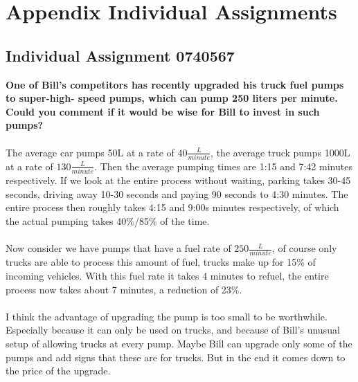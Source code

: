 \section{Appendix Individual Assignments}\label{app:indiv}
\subsection{Individual Assignment 0740567}\label{app:indivnicky}
\textbf{One of Bill’s competitors has recently upgraded his truck fuel pumps to super-high- speed pumps, which can pump 250 liters per minute. Could you comment if it would be wise for Bill to invest in such pumps?}\\
\\
The average car pumps 50L at a rate of $40\frac{L}{minute}$, the average truck pumps 1000L at a rate of $130\frac{L}{minute}$. Then the average pumping times are 1:15 and 7:42 minutes respectively. If we look at the entire process without waiting, parking takes 30-45 seconds, driving away 10-30 seconds and paying 90 seconds to 4:30 minutes. The entire process then roughly takes 4:15 and 9:00s minutes respectively, of which the actual pumping takes 40\%/85\% of the time.\\
\\
Now consider we have pumps that have a fuel rate of $250\frac{L}{minute}$, of course only trucks are able to process this amount of fuel, trucks make up for 15\% of incoming vehicles. With this fuel rate it takes 4 minutes to refuel, the entire process now takes about 7 minutes, a reduction of 23\%.\\
\\
I think the advantage of upgrading the pump is too small to be worthwhile. Especially because it can only be used on trucks, and because of Bill's unusual setup of allowing trucks at every pump. Maybe Bill can upgrade only some of the pumps and add signs that these are for trucks. But in the end it comes down to the price of the upgrade.
\newpage
